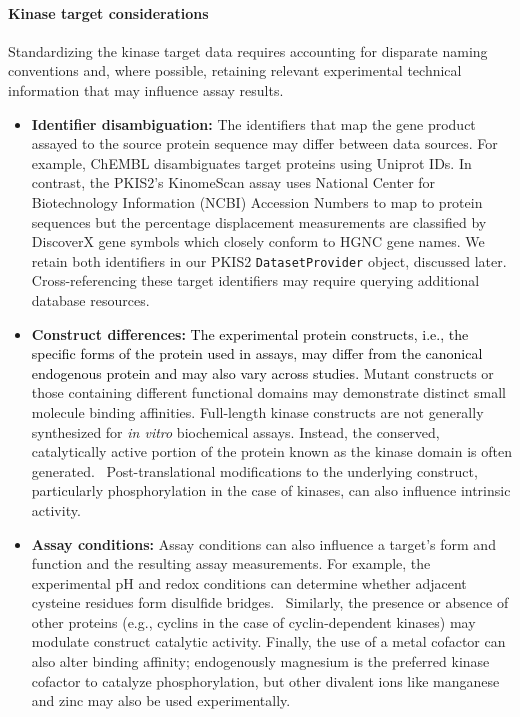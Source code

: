 \documentclass[9pt,lessons, pubversion]{livecoms}
\newcommand{\revision}[1]{\textcolor{black}{#1}}
\begin{document}
\paragraph{Kinase target considerations}
Standardizing the kinase target data requires accounting for disparate naming conventions and, where possible, retaining relevant experimental technical information that may influence assay results.
\begin{itemize}
\item {\bf Identifier disambiguation:} The identifiers that map the gene product assayed to the source protein sequence may differ between data sources. For example, ChEMBL disambiguates target proteins using Uniprot IDs. In contrast, the PKIS2's KinomeScan assay uses National Center for Biotechnology Information (NCBI) Accession Numbers to map to protein sequences but the percentage displacement measurements are classified by DiscoverX gene symbols which closely conform to HGNC gene names. We retain both identifiers in our PKIS2 \texttt{DatasetProvider} object, discussed later. Cross-referencing these target identifiers may require querying additional database resources. 
\item {\bf Construct differences:} \revision{The experimental protein constructs, i.e., the specific forms of the protein used in assays, may differ from the canonical endogenous protein and may also vary across studies.} Mutant constructs or those containing different functional domains may demonstrate distinct small molecule binding affinities. Full-length kinase constructs are not generally synthesized for \textit{in vitro} biochemical assays. Instead, the conserved, catalytically active portion of the protein known as the kinase domain is often generated.~\cite{diwanji2019full} Post-translational modifications to the underlying construct, particularly phosphorylation in the case of kinases, can also influence intrinsic activity.
\item {\bf Assay conditions:} Assay conditions can also influence a target's form and function and the resulting assay measurements. For example, the experimental pH and redox conditions can determine whether adjacent cysteine residues form disulfide bridges.~\cite{ruiz2022disulfide} Similarly, the presence or absence of other proteins (e.g., cyclins in the case of cyclin-dependent kinases) may modulate construct catalytic activity. Finally, the use of a metal cofactor can also alter binding affinity; endogenously magnesium is the preferred kinase cofactor to catalyze phosphorylation, but other divalent ions like manganese and zinc may also be used experimentally.~\cite{knape2017cofactor}
\end{itemize}
\end{document}
